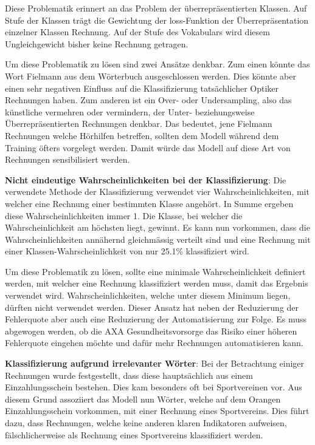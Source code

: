 Diese Problematik erinnert an das Problem der überrepräsentierten Klassen. Auf Stufe der Klassen trägt die Gewichtung der loss-Funktion der Überrepräsentation einzelner Klassen Rechnung. Auf der Stufe des Vokabulars wird diesem Ungleichgewicht bisher keine Rechnung getragen.

Um diese Problematik zu lösen sind zwei Ansätze denkbar. Zum einen könnte das Wort Fielmann aus dem Wörterbuch ausgeschlossen werden. Dies könnte aber einen sehr negativen Einfluss auf die Klassifizierung tatsächlicher Optiker Rechnungen haben. Zum anderen ist ein Over- oder Undersampling, also das künstliche vermehren oder vermindern, der Unter- beziehungsweise Überrepräsentierten Rechnungen denkbar. Das bedeutet, jene Fielmann Rechnungen welche Hörhilfen betreffen, sollten dem Modell während dem Training öfters vorgelegt werden. Damit würde das Modell auf diese Art von Rechnungen sensibilisiert werden.


\textbf{Nicht eindeutige Wahrscheinlichkeiten bei der Klassifizierung}: Die verwendete Methode der Klassifizierung verwendet vier Wahrscheinlichkeiten, mit welcher eine Rechnung einer bestimmten Klasse angehört. In Summe ergeben diese Wahrscheinlichkeiten immer 1. Die Klasse, bei welcher die Wahrscheinlichkeit am höchsten liegt, gewinnt. Es kann nun vorkommen, dass die Wahrscheinlichkeiten annähernd gleichmässig verteilt sind und eine Rechnung mit einer Klassen-Wahrscheinlichkeit von nur 25.1\% klassifiziert wird.

Um diese Problematik zu lösen, sollte eine minimale Wahrscheinlichkeit definiert werden, mit welcher eine Rechnung klassifiziert werden muss, damit das Ergebnis verwendet wird. Wahrscheinlichkeiten, welche unter diesem Minimum liegen, dürften nicht verwendet werden. Dieser Ansatz hat neben der Reduzierung der Fehlerquote aber auch eine Reduzierung der Automatisierung zur Folge. Es muss abgewogen werden, ob die AXA Gesundheitsvorsorge das Risiko einer höheren Fehlerquote eingehen möchte und dafür mehr Rechnungen automatisieren kann.


\textbf{Klassifizierung aufgrund irrelevanter Wörter}: Bei der Betrachtung einiger Rechnungen wurde festgestellt, dass diese hauptsächlich aus einem Einzahlungsschein bestehen. Dies kam besonders oft bei Sportvereinen vor. Aus diesem Grund assoziiert das Modell nun Wörter, welche auf dem Orangen Einzahlungsschein vorkommen, mit einer Rechnung eines Sportvereins. Dies führt dazu, dass Rechnungen, welche keine anderen klaren Indikatoren aufweisen, fälschlicherweise als Rechnung eines Sportvereins klassifiziert werden.

